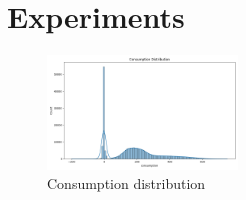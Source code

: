 \documentclass{ieeeaccess}
\begin{document}
\section{Experiments}\label{s:experiments}

\begin{figure}[h]
    \centering
    \includegraphics[width=0.45\textwidth]{consumption_distribution}
    \caption{Consumption distribution}
    \label{fig:figure_consumption_distribution}
    \end{figure}
\end{document}
